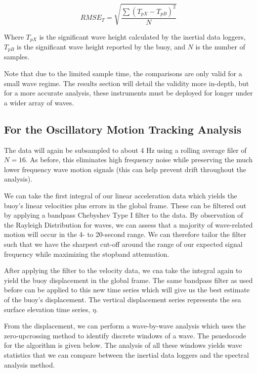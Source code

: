 \begin{equation}
    RMSE_T = \sqrt{\frac{\sum{(T_{pX}-T_{pB})^2}}{N}}
\end{equation}

Where $T_{pX}$ is the significant wave height calculated by the inertial data loggers, $T_{pB}$ is the significant wave height reported by the buoy, and $N$ is the number of samples.

Note that due to the limited sample time, the comparisons are only valid for a small wave regime. 
The results section will detail the validity more in-depth, but for a more accurate analysis, these instruments must be deployed for longer under a wider array of waves.

\subsection{For the Oscillatory Motion Tracking Analysis}

The data will again be subsampled to about 4 Hz using a rolling average filer of $N=16$. 
As before, this eliminates high frequency noise while preserving the much lower frequency wave motion signals (this can help prevent drift throughout the analysis).

We can take the first integral of our linear acceleration data which yields the buoy’s linear velocities plus errors in the global frame. 
These can be filtered out by applying a bandpass Chebyshev Type I filter to the data. 
By observation of the Rayleigh Distribution for waves, we can assess that a majority of wave-related motion will occur in the 4- to 20-second range. 
We can therefore tailor the filter such that we have the sharpest cut-off around the range of our expected signal frequency while maximizing the stopband attenuation.

After applying the filter to the velocity data, we cna take the integral again to yield the buoy displacement in the global frame. 
The same bandpass filter as used before can be applied to this new time series which will give us the best estimate of the buoy’s displacement. 
The vertical displacement series represents the sea surface elevation time series, $\eta$.

From the displacement, we can perform a wave-by-wave analysis which uses the zero-upcrossing method to identify discrete windows of a wave. 
The psuedocode for the algorithm is given below. 
The analysis of all these windows yields wave statistics that we can compare between the inertial data loggers and the spectral analysis method.

